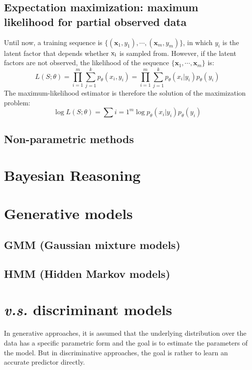 \documentclass{article}
\begin{document}
	\subsection{Expectation maximization: maximum likelihood for partial observed data}
	Until now, a training sequence is $\{(\bm{x}_1,y_1),\cdots,(\bm{x}_m,y_m)\}$, in which $y_i$ is the latent factor that depends whether $\rm{x}_i$ is sampled from. However, if the latent factors are not observed, the likelihood of the sequence $\{\bm{x}_1,\cdots,\bm{x}_m\}$ is:
	\begin{equation*}
	L(S;\theta) = \prod_{i=1}^m \sum_{j=1}^k p_\theta(x_i,y_i) = \prod_{i=1}^m \sum_{j=1}^k p_\theta(x_i|y_i)p_\theta(y_i)
	\end{equation*}
	The maximum-likelihood estimator is therefore the solution of the maximization problem:
	\begin{equation}
	\log L(S;\theta) = \sum{i=1}^m \log p_\theta(x_i|y_i)p_\theta(y_i)
	\end{equation}
	\subsection{Non-parametric methods}

\section{Bayesian Reasoning}

\section{Generative models}
	\subsection{GMM (Gaussian mixture models)}
	\subsection{HMM (Hidden Markov models)}

\section{\textit{v.s.} discriminant models}
	\label{sec:final}
	In generative approaches, it is assumed that the underlying distribution over the data has a specific parametric form and the goal is to estimate the parameters of the model. But in discriminative approaches, the goal is rather to learn an accurate predictor directly. 
	
\end{document}

